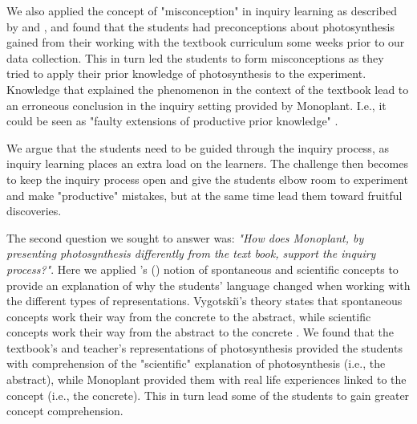 We also applied the concept of "misconception" in inquiry learning as described by \citet{gomez2008elementary} and \citet{smith1994misconceptions}, and found that the students had preconceptions about photosynthesis gained from their working with the textbook curriculum some weeks prior to our data collection. This in turn led the students to form misconceptions as they tried to apply their prior knowledge of photosynthesis to the experiment. Knowledge that explained the phenomenon in the context of the textbook lead to an erroneous conclusion in the inquiry setting provided by Monoplant. I.e., it could be seen as "faulty extensions of productive prior knowledge" \citep{smith1994misconceptions}. 

We argue that the students need to be guided through the inquiry process, as inquiry learning places an extra load on the learners. The challenge then becomes to keep the inquiry process open and give the students elbow room to experiment and make "productive" mistakes, but at the same time lead them toward fruitful discoveries. 



The second question we sought to answer was: \emph{"How does Monoplant, by presenting photosynthesis differently from the text book, support the inquiry process?"}. Here we applied \citeauthor{vygotsky2012thought}'s (\citeyear{vygotsky2012thought}) notion of spontaneous and scientific concepts to provide an explanation of why the students' language changed when working with the different types of representations. Vygotski{\u\i}'s theory states that spontaneous concepts work their way from the concrete to the abstract, while scientific concepts work their way from the abstract to the concrete \citep{vygotsky2012thought}. We found that the textbook's and teacher's representations of photosynthesis provided the students with comprehension of the "scientific" explanation of photosynthesis (i.e., the abstract), while Monoplant provided them with real life experiences linked to the concept (i.e., the concrete). This in turn lead some of the students to gain greater concept comprehension. 

